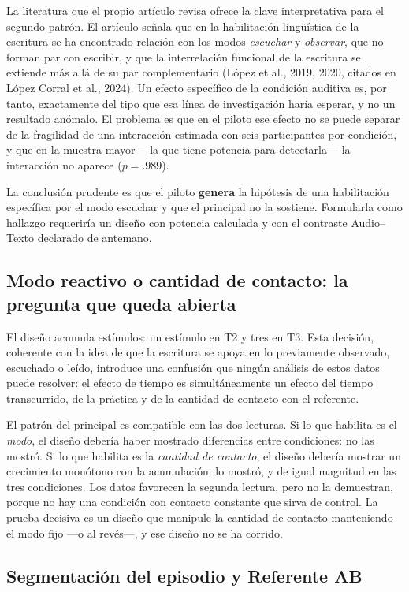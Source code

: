 \documentclass[12pt]{article}
\begin{document}
La literatura que el propio artículo revisa ofrece la clave interpretativa para el segundo
patrón. El artículo señala que en la habilitación lingüística de la escritura se ha encontrado
relación con los modos \emph{escuchar} y \emph{observar}, que no forman par con escribir, y que
la interrelación funcional de la escritura se extiende más allá de su par complementario
(López et al., 2019, 2020, citados en López Corral et al., 2024). Un efecto específico de la
condición auditiva es, por tanto, exactamente del tipo que esa línea de investigación haría
esperar, y no un resultado anómalo. El problema es que en el piloto ese efecto no se puede
separar de la fragilidad de una interacción estimada con seis participantes por condición, y que
en la muestra mayor —la que tiene potencia para detectarla— la interacción no aparece
($p = .989$).

La conclusión prudente es que el piloto \textbf{genera} la hipótesis de una habilitación
específica por el modo escuchar y que el principal no la sostiene. Formularla como hallazgo
requeriría un diseño con potencia calculada y con el contraste Audio--Texto declarado de
antemano.

\subsection{Modo reactivo o cantidad de contacto: la pregunta que queda abierta}

El diseño acumula estímulos: un estímulo en T2 y tres en T3. Esta decisión, coherente con la
idea de que la escritura se apoya en lo previamente observado, escuchado o leído, introduce una
confusión que ningún análisis de estos datos puede resolver: el efecto de tiempo es
simultáneamente un efecto del tiempo transcurrido, de la práctica y de la cantidad de contacto
con el referente.

El patrón del principal es compatible con las dos lecturas. Si lo que habilita es el
\emph{modo}, el diseño debería haber mostrado diferencias entre condiciones: no las mostró. Si
lo que habilita es la \emph{cantidad de contacto}, el diseño debería mostrar un crecimiento
monótono con la acumulación: lo mostró, y de igual magnitud en las tres condiciones. Los datos
favorecen la segunda lectura, pero no la demuestran, porque no hay una condición con contacto
constante que sirva de control. La prueba decisiva es un diseño que manipule la cantidad de
contacto manteniendo el modo fijo —o al revés—, y ese diseño no se ha corrido.

\subsection{Segmentación del episodio y Referente AB}
\end{document}
